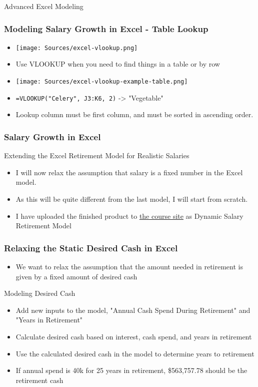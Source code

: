 \documentclass[handout, 11pt]{beamer}
\begin{document}
\begin{section}{Advanced Excel Modeling}
\begin{frame}
\frametitle{Modeling Salary Growth in Excel - Table Lookup}
\begin{itemize}
\item \texttt{[image: Sources/excel-vlookup.png]}
\vfill
\item Use VLOOKUP when you need to find things in a table or by row
\vfill
\item \texttt{[image: Sources/excel-vlookup-example-table.png]}
\vfill
\item \texttt{=VLOOKUP("Celery", J3:K6, 2)}
-> "Vegetable"
\vfill
\item Lookup column must be first column, and must be sorted in ascending order.
\end{itemize}
\end{frame}
\begin{frame}
\frametitle{Salary Growth in Excel}
{
\begin{block}{Extending the Excel Retirement Model for Realistic Salaries}
\begin{itemize}
\item I will now relax the assumption that salary is a fixed number in the Excel model.
\item As this will be quite different from the last model, I will start from scratch.
\item I have uploaded the finished product to
\textcolor{blue}{\underline{\href{https://nickderobertis.github.io/fin-model-course/}{the course site}}}
as Dynamic Salary Retirement Model
\end{itemize}
\end{block}
}
\end{frame}
\begin{frame}
\frametitle{Relaxing the Static Desired Cash in Excel}
\begin{itemize}
\item We want to relax the assumption that the amount needed in retirement is given by a fixed amount of desired cash
\end{itemize}
\vfill
{
\begin{block}{Modeling Desired Cash}
\begin{itemize}
\item Add new inputs to the model, "Annual Cash Spend During Retirement" and "Years in Retirement"
\item Calculate desired cash based on interest, cash spend, and years in retirement
\item Use the calculated desired cash in the model to determine years to retirement
\item If annual spend is 40k for 25 years in retirement, \$563,757.78 should be the retirement cash
\end{itemize}
\vfill
\end{block}
}
\end{frame}
\end{section}
\end{document}
